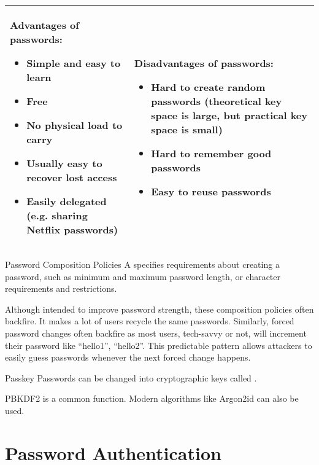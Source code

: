 \documentclass[code]{amznotes}
\begin{document}
\begin{tabularx}{\linewidth}{| X | X |}
    \hline
    Advantages of passwords:
    \begin{itemize}[noitemsep,leftmargin=*]
        \item Simple and easy to learn
        \item Free
        \item No physical load to carry
        \item Usually easy to recover lost access
        \item Easily delegated (e.g. sharing Netflix passwords)
    \end{itemize}
    &
    Disadvantages of passwords:
    \begin{itemize}[noitemsep,leftmargin=*]
        \item Hard to create random passwords (theoretical key space is large, but practical key space is small)
        \item Hard to remember good passwords
        \item Easy to reuse passwords
    \end{itemize}
    \\ \hline
\end{tabularx}


\begin{dfnbox}{Password Composition Policies}{}
    A  specifies requirements about creating a password, such as minimum and maximum password length, or character requirements and restrictions.
\end{dfnbox}

Although intended to improve password strength, these composition policies often backfire. It makes a lot of users recycle the same passwords. Similarly, forced password changes often backfire as most users, tech-savvy or not, will increment their password like ``hello1'', ``hello2''. This predictable pattern allows attackers to easily guess passwords whenever the next forced change happens.

\begin{dfnbox}{Passkey}{}
    Passwords can be changed into cryptographic keys called .
\end{dfnbox}

PBKDF2 is a common function. Modern algorithms like Argon2id can also be used.

\section{Password Authentication}
\end{document}
